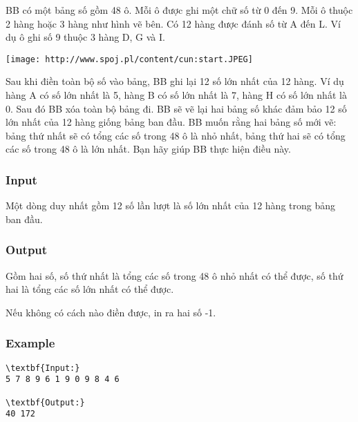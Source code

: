 



   BB có một bảng số gồm 48 ô. Mỗi ô được ghi một chữ số từ 0 đến 9. Mỗi ô thuộc 2 hàng hoặc 3 hàng như hình vẽ bên. Có 12 hàng được đánh số từ A đến L. Ví dụ ô ghi số 9 thuộc 3 hàng D, G và I.  


\texttt{[image: http://www.spoj.pl/content/cun:start.JPEG]}

   Sau khi điền toàn bộ số vào bảng, BB ghi lại 12 số lớn nhất của 12 hàng. Ví dụ hàng A có số lớn nhất là 5, hàng B có số lớn nhất là 7, hàng H có số lớn nhất là 0. Sau đó BB xóa toàn bộ bảng đi. BB sẽ vẽ lại hai bảng số khác đảm bảo 12 số lớn nhất của 12 hàng giống bảng ban đầu. BB muốn rằng hai bảng số mới vẽ: bảng thứ nhất sẽ có tổng các số trong 48 ô là nhỏ nhất, bảng thứ hai sẽ có tổng các số trong 48 ô là lớn nhất. Bạn hãy giúp BB thực hiện điều này.  

\subsubsection{   Input  }

   Một dòng duy nhất gồm 12 số lần lượt là số lớn nhất của 12 hàng trong bảng ban đầu.  

\subsubsection{   Output  }

   Gồm hai số, số thứ nhất là tổng các số trong 48 ô nhỏ nhất có thể được, số thứ hai là tổng các số lớn nhất có thể được.  

   Nếu không có cách nào điền được, in ra hai số -1.  

\subsubsection{   Example  }
\begin{verbatim}
\textbf{Input:}
5 7 8 9 6 1 9 0 9 8 4 6

\textbf{Output:}
40 172

\end{verbatim}